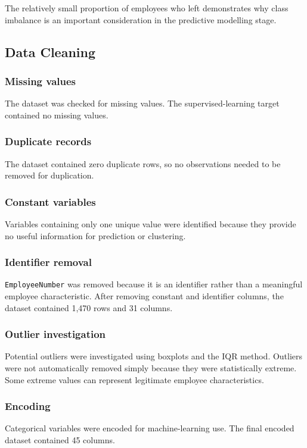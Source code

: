 \documentclass[11pt]{article}
\begin{document}
The relatively small proportion of employees who left demonstrates why class imbalance is an important consideration in the predictive modelling stage.

\subsection{Data Cleaning}

\subsubsection*{Missing values}
The dataset was checked for missing values. The supervised-learning target contained no missing values.

\subsubsection*{Duplicate records}
The dataset contained zero duplicate rows, so no observations needed to be removed for duplication.

\subsubsection*{Constant variables}
Variables containing only one unique value were identified because they provide no useful information for prediction or clustering.

\subsubsection*{Identifier removal}
\texttt{EmployeeNumber} was removed because it is an identifier rather than a meaningful employee characteristic. After removing constant and identifier columns, the dataset contained 1,470 rows and 31 columns.

\subsubsection*{Outlier investigation}
Potential outliers were investigated using boxplots and the IQR method. Outliers were not automatically removed simply because they were statistically extreme. Some extreme values can represent legitimate employee characteristics.

\subsubsection*{Encoding}
Categorical variables were encoded for machine-learning use. The final encoded dataset contained 45 columns.
\end{document}
